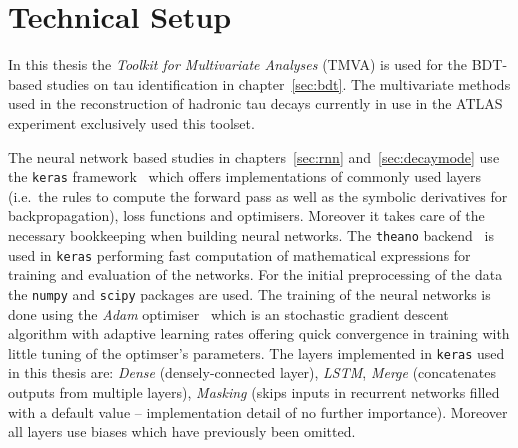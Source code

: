 \section{Technical Setup}
\label{sec:tech_setup}

In this thesis the \emph{Toolkit for Multivariate Analyses} (TMVA) \cite{tmva}
is used for the BDT-based studies on tau identification in
chapter~\ref{sec:bdt}. The multivariate methods used in the reconstruction of
hadronic tau decays currently in use in the ATLAS experiment exclusively used
this toolset.

The neural network based studies in chapters~\ref{sec:rnn}
and~\ref{sec:decaymode} use the \texttt{keras} framework~\cite{keras} which
offers implementations of commonly used layers (i.e.\ the rules to compute the
forward pass as well as the symbolic derivatives for backpropagation), loss
functions and optimisers. Moreover it takes care of the necessary bookkeeping
when building neural networks. The \texttt{theano} backend~\cite{theano} is used
in \texttt{keras} performing fast computation of mathematical expressions for
training and evaluation of the networks. For the initial preprocessing of the
data the \texttt{numpy} \cite{numpy} and \texttt{scipy} \cite{scipy} packages
are used. The training of the neural networks is done using the \emph{Adam}
optimiser~\cite{adam} which is an stochastic gradient descent algorithm with
adaptive learning rates offering quick convergence in training with little
tuning of the optimser's parameters. The layers implemented in \texttt{keras}
used in this thesis are: \emph{Dense} (densely-connected layer), \emph{LSTM},
\emph{Merge} (concatenates outputs from multiple layers), \emph{Masking} (skips
inputs in recurrent networks filled with a default value -- implementation
detail of no further importance). Moreover all layers use biases which have
previously been omitted.

